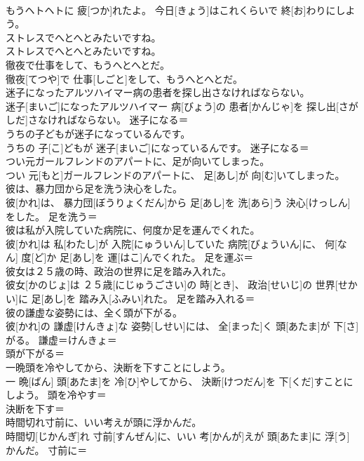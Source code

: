 \documentclass[8pt]{extreport}
\begin{document}
\begin{CJK}{UTF8}{min}
\\	もうヘトヘトに 疲[つか]れたよ。 今日[きょう]はこれくらいで 終[お]わりにしよう。	
\\	ストレスでへとへとみたいですね。	
\\	ストレスでへとへとみたいですね。	
\\	徹夜で仕事をして、もうへとへとだ。	
\\	徹夜[てつや]で 仕事[しごと]をして、もうへとへとだ。	
\\	迷子になったアルツハイマー病の患者を探し出さなければならない。	
\\	迷子[まいご]になったアルツハイマー 病[びょう]の 患者[かんじゃ]を 探し出[さがしだ]さなければならない。	迷子になる＝ 
\\	うちの子どもが迷子になっているんです。	
\\	うちの 子[こ]どもが 迷子[まいご]になっているんです。	迷子になる＝ 
\\	つい元ガールフレンドのアパートに、足が向いてしまった。	
\\	つい 元[もと]ガールフレンドのアパートに、 足[あし]が 向[む]いてしまった。	
\\	彼は、暴力団から足を洗う決心をした。	
\\	彼[かれ]は、 暴力団[ぼうりょくだん]から 足[あし]を 洗[あら]う 決心[けっしん]をした。	足を洗う＝ 
\\	彼は私が入院していた病院に、何度か足を運んでくれた。	
\\	彼[かれ]は 私[わたし]が 入院[にゅういん]していた 病院[びょういん]に、 何[なん] 度[ど]か 足[あし]を 運[はこ]んでくれた。	足を運ぶ＝ 
\\	彼女は２５歳の時、政治の世界に足を踏み入れた。	
\\	彼女[かのじょ]は ２５歳[にじゅうごさい]の 時[とき]、 政治[せいじ]の 世界[せかい]に 足[あし]を 踏み入[ふみい]れた。	足を踏み入れる＝ 
\\	彼の謙虚な姿勢には、全く頭が下がる。	
\\	彼[かれ]の 謙虚[けんきょ]な 姿勢[しせい]には、 全[まった]く 頭[あたま]が 下[さ]がる。	謙虚＝けんきょ＝ 
\\	頭が下がる＝ 
\\	一晩頭を冷やしてから、決断を下すことにしよう。	
\\	一 晩[ばん] 頭[あたま]を 冷[ひ]やしてから、 決断[けつだん]を 下[くだ]すことにしよう。	頭を冷やす＝ 
\\	決断を下す＝ 
\\	時間切れ寸前に、いい考えが頭に浮かんだ。	
\\	時間切[じかんぎ]れ 寸前[すんぜん]に、いい 考[かんが]えが 頭[あたま]に 浮[う]かんだ。	寸前に＝ 

\end{CJK}
\end{document}
